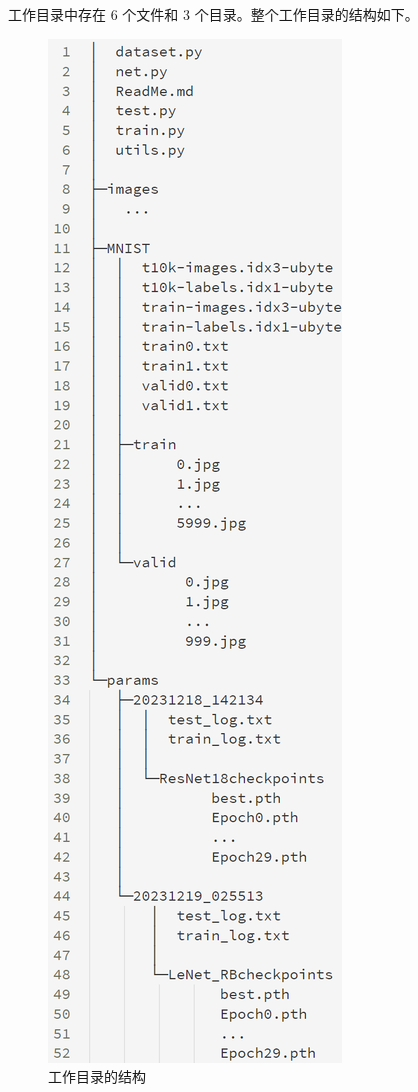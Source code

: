 \documentclass[supercite]{Experimental_Report}
\theoremstyle{definition}
\begin{document}
工作目录中存在 6 个文件和 3 个目录。整个工作目录的结构如下。
\begin{figure}[H]
	\begin{center}
		\includegraphics[scale=0.5]{../images/tree.png}
		\caption{工作目录的结构}
	\end{center}
\end{figure}
\end{document}
